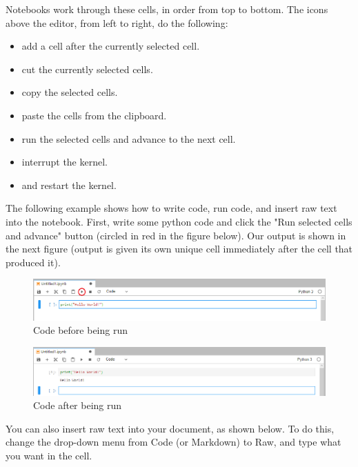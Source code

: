 \documentclass[pdftex,12pt]{artikel3}
\begin{document}
Notebooks work through these cells, in order from top to bottom. The icons above the editor, from left to right, do the following: 

\begin{itemize}
    \item add a cell after the currently selected cell.
    \item cut the currently selected cells.
    \item copy the selected cells.
    \item paste the cells from the clipboard.
    \item run the selected cells and advance to the next cell.
    \item interrupt the kernel.
    \item and restart the kernel.
\end{itemize}

The following example shows how to write code, run code, and insert raw text into the notebook. First, write some python code and click the "Run selected cells and advance" button (circled in red in the figure below). Our output is shown in the next figure (output is given its own unique cell immediately after the cell that produced it).

\begin{figure}[h!]
    \centering
    \includegraphics[width=15cm]{code_before_running.png}
    \caption{Code before being run}
    \label{fig:codebeforerunning}
\end{figure}

\begin{figure}[h!]
    \centering
    \includegraphics[width=15cm]{code_after_running.png}
    \caption{Code after being run}
    \label{fig:codeafterrunning}
\end{figure}

You can also insert raw text into your document, as shown below. To do this, change the drop-down menu from Code (or Markdown) to Raw, and type what you want in the cell.
\end{document}
